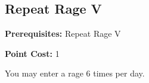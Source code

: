 \subsection{Repeat Rage V}\label{feat:repeatrage5}

\noindent
\textbf{Prerequisites:} Repeat Rage V

\noindent
\textbf{Point Cost:} 1

You may enter a rage 6 times per day.
